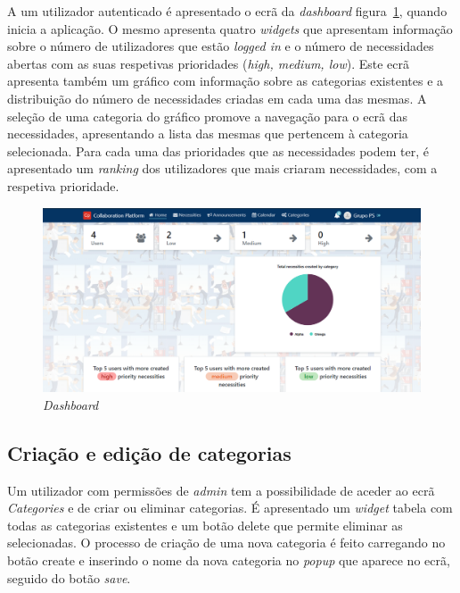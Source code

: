 A um utilizador autenticado é apresentado o ecrã da \textit{dashboard} figura~\ref{fig:Dashboard}, quando inicia a aplicação.
O mesmo apresenta quatro \textit{widgets} que apresentam informação sobre o número de utilizadores que estão \textit{logged in} e o número de necessidades abertas com as suas respetivas prioridades (\textit{high, medium, low}).
Este ecrã apresenta também um gráfico com informação sobre as categorias existentes e a distribuição do número de necessidades criadas em cada uma das mesmas.
A seleção de uma categoria do gráfico promove a navegação para o ecrã das necessidades,  apresentando a lista das mesmas que pertencem à categoria selecionada.
Para cada uma das prioridades que as necessidades podem ter, é apresentado um \textit{ranking} dos utilizadores que mais criaram necessidades, com a respetiva prioridade.

\begin{figure}[H]
  \centering 
  \includegraphics[scale=0.4]{figures/Dashboard.png}
  \caption{\textit{Dashboard}}\label{fig:Dashboard}
\end{figure}


\subsection{Criação e edição de categorias}\label{subsec:implementacao:categories}

Um utilizador com permissões de \textit{admin} tem a possibilidade de aceder ao ecrã \textit{Categories} e de criar ou eliminar categorias. 
É apresentado um \textit{widget} tabela com todas as categorias existentes e um botão delete que permite eliminar as selecionadas.
O processo de criação de uma nova categoria é feito carregando no botão create e inserindo o nome da nova categoria no \textit{popup} que aparece no ecrã, seguido do botão \textit{save}.


